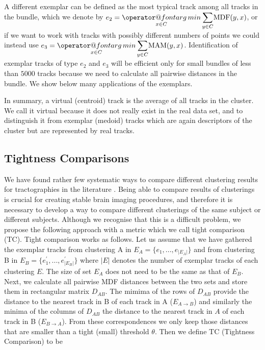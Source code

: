 \documentclass[preprint,authoryear,a4paper,10pt,onecolumn]{elsarticle}
\makeatletter
\def\argmin{\mathop{\operator@font arg\,min}}
\makeatother
\begin{document}
A different exemplar can be defined as the most typical track among all
tracks in the bundle, which we denote by $e_{2}={\displaystyle
  \argmin_{x\in C}}\,{\displaystyle \sum_{y\in C}}\mathrm{MDF}(y,x)$, or
if we want to work with tracks with possibly different numbers of points
we could instead use $e_{3}={\displaystyle \argmin_{x\in
    C}}\,{\displaystyle \sum_{y\in C}}\mathrm{MAM}(y,x)$.
Identification of exemplar tracks of type $e_{2}$ and $e_{3}$ will be
efficient only for small bundles of less than $5000$ tracks because we
need to calculate all pairwise distances in the bundle. We show below
many applications of the exemplars. 

In summary, a virtual (centroid) track is the average of all tracks in
the cluster. We call it virtual because it does not really exist in the
real data set, and to distinguish it from exemplar (medoid) tracks which
are again descriptors of the cluster but are represented by real tracks.

\subsection{Tightness Comparisons\label{sub:Tightness-comparisons-1}}

We have found rather few systematic ways to compare different clustering
results for tractographies in the literature
\citep{moberts2005evaluation}.  Being able to compare results of
clusterings is crucial for creating stable brain imaging procedures, and
therefore it is necessary to develop a way to compare different
clusterings of the same subject or different subjects. Although we
recognise that this is a difficult problem, we propose the following
approach with a metric which we call tight comparison (TC). Tight
comparison works as follows. Let us assume that we have gathered the
exemplar tracks from clustering A in $E_{A}=\{e_{1},...,e_{|E_{A}|}\}$
and from clustering B in $E_{B}=\{e_{1}^{'},...,e_{|E_{B}|}^{'}\}$ where
$|E|$ denotes the number of exemplar tracks of each clustering $E$. The
size of set $E_{A}$ does not need to be the same as that of
$E_{B}$. Next, we calculate all pairwise MDF distances between the two
sets and store them in rectangular matrix $D_{AB}$. The mimima of the
rows of $D_{AB}$ provide the distance to the nearest track in B of each
track in A ($E_{A\rightarrow B}$) and similarly the minima of the
columns of $D_{AB}$ the distance to the nearest track in $A$ of each
track in B ($E_{B\rightarrow A}$). From these correspondences we only
keep those distances that are smaller than a tight (small) threshold
$\theta$. Then we define TC (Tightness Comparison) to be
\end{document}
